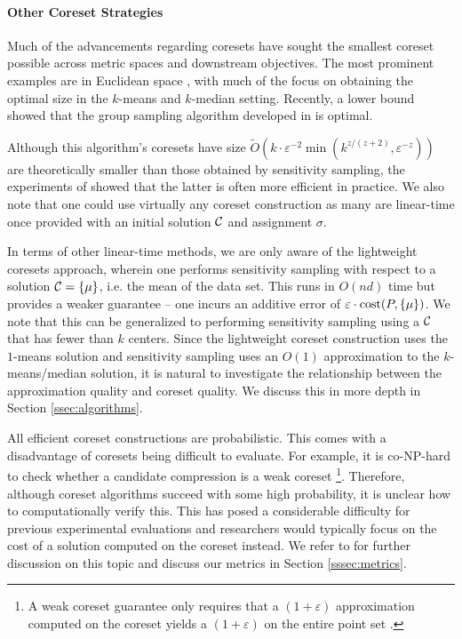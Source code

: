 

\paragraph*{Other Coreset Strategies}
\label{ssec:clustering_prelim}

Much of the advancements regarding coresets have sought the smallest coreset possible across metric spaces and downstream objectives. The most prominent
examples are in Euclidean space \cite{BadoiuHI02, HaM04, Chen09, HuangV20, stoc22}, with much of the focus on obtaining the optimal size in the $k$-means and
$k$-median setting. Recently, a lower bound \cite{huangLB} showed that the group sampling algorithm developed in \cite{stoc21, stoc22} is optimal.

Although this algorithm's coresets have size $\tilde{O}(k\cdot \varepsilon^{-2} \min(k^{z/(z+2)},\varepsilon^{-z}))$ \cite{CLSSS22} are theoretically smaller than
those obtained by sensitivity sampling, the experiments of \cite{chrisESA} showed that the latter is often more efficient in practice. We also note that one
could use virtually any coreset construction as many are linear-time once provided with an initial solution $\mathcal C$ and assignment $\sigma$.

In terms of other linear-time methods, we are only aware of the lightweight coresets approach\cite{BachemL018}, wherein one performs sensitivity
sampling with respect to a solution $\mathcal C=\{\mu\}$, i.e. the mean of the data set. This runs in $O(nd)$ time but provides a weaker guarantee -- one incurs an
additive error of $\varepsilon\cdot \operatorname{cost}(P,\{\mu\})$.  We note that this can be generalized to performing sensitivity sampling using a $\mathcal C$ that has fewer
than $k$ centers. Since the lightweight coreset construction uses the $1$-means solution and sensitivity sampling uses an $O(1)$ approximation to the
$k$-means/median solution, it is natural to investigate the relationship between the approximation quality and coreset quality. We discuss this in more depth in
Section \ref{ssec:algorithms}.

All efficient coreset constructions are probabilistic. This comes with a disadvantage of coresets being difficult to evaluate. For example, it is co-NP-hard to
check whether a candidate compression is a weak coreset \footnote{A weak coreset guarantee only requires that a $(1+\varepsilon)$ approximation
computed on the coreset yields a $(1+\varepsilon)$ on the entire point set \cite{chrisESA}.}. Therefore, although coreset algorithms succeed with some high probability, it is
unclear how to computationally verify this.  This has posed a considerable difficulty for previous experimental evaluations and researchers would typically
focus on the cost of a solution computed on the coreset instead. We refer to \cite{chrisESA} for further discussion on this topic and discuss our metrics in
Section \ref{sssec:metrics}.

